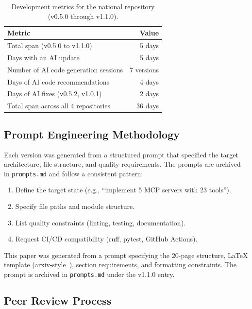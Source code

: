\documentclass{article}
\begin{document}
\begin{table}[H]
\centering
\caption{Development metrics for the national repository (v0.5.0 through v1.1.0).}
\label{tab:dev-metrics}
\small
\begin{tabular}{@{}lr@{}}
\toprule
\textbf{Metric} & \textbf{Value} \\
\midrule
Total span (v0.5.0 to v1.1.0) & 5 days \\
Days with an AI update & 5 days \\
Number of AI code generation sessions & 7 versions \\
Days of AI code recommendations & 4 days \\
Days of AI fixes (v0.5.2, v1.0.1) & 2 days \\
Total span across all 4 repositories & 36 days \\
\bottomrule
\end{tabular}
\end{table}

\subsection{Prompt Engineering Methodology}

Each version was generated from a structured prompt that specified the target architecture, file structure, and quality requirements. The prompts are archived in \texttt{prompts.md} and follow a consistent pattern:

\begin{enumerate}[leftmargin=*]
\item Define the target state (e.g., ``implement 5 MCP servers with 23 tools'').
\item Specify file paths and module structure.
\item List quality constraints (linting, testing, documentation).
\item Request CI/CD compatibility (ruff, pytest, GitHub Actions).
\end{enumerate}

This paper was generated from a prompt specifying the 20-page structure, LaTeX template (arxiv-style~\cite{arxivstyle}), section requirements, and formatting constraints. The prompt is archived in \texttt{prompts.md} under the v1.1.0 entry.

\subsection{Peer Review Process}
\end{document}
